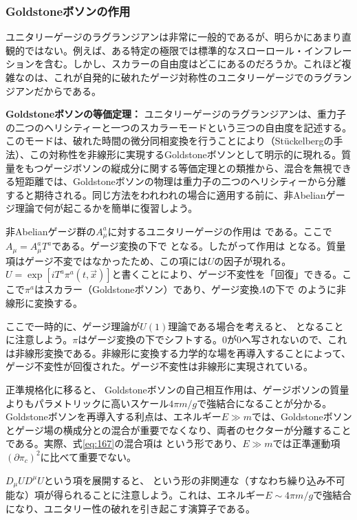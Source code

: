 \subsubsection{Goldstoneボソンの作用}

ユニタリーゲージのラグランジアンは非常に一般的であるが、明らかにあまり直観的ではない。例えば、ある特定の極限では標準的なスローロール・インフレーションを含む。しかし、スカラーの自由度はどこにあるのだろうか。これほど複雑なのは、これが自発的に破れたゲージ対称性のユニタリーゲージでのラグランジアンだからである。

\noindent\textbf{Goldstoneボソンの等価定理：}
ユニタリーゲージのラグランジアンは、重力子の二つのヘリシティーと一つのスカラーモードという三つの自由度を記述する。このモードは、破れた時間の微分同相変換を行うことにより（Stückelbergの手法）、この対称性を非線形に実現するGoldstoneボソンとして明示的に現れる。質量をもつゲージボソンの縦成分に関する等価定理\cite{Cornwall:1974km}との類推から、混合を無視できる短距離では、Goldstoneボソンの物理は重力子の二つのヘリシティーから分離すると期待される。同じ方法をわれわれの場合に適用する前に、非Abelianゲージ理論で何が起こるかを簡単に復習しよう。

非Abelianゲージ群の$A_\mu^a$に対するユニタリーゲージの作用は
である。ここで$A_\mu=A_\mu^aT^a$である。ゲージ変換の下で
となる。したがって作用は
となる。質量項はゲージ不変ではなかったため、この項には$U$の因子が現れる。$U=\exp[iT^a\pi^a(t,\vec{x})]$と書くことにより、ゲージ不変性を「回復」できる。ここで$\pi^a$はスカラー（Goldstoneボソン）であり、ゲージ変換$\Lambda$の下で
のように非線形に変換する。

ここで一時的に、ゲージ理論が$U(1)$理論である場合を考えると、
となることに注意しよう。$\pi$はゲージ変換の下でシフトする。$0$が$0$へ写されないので、これは非線形変換である。非線形に変換する力学的な場を再導入することによって、ゲージ不変性が回復された。ゲージ不変性は非線形に実現されている。

正準規格化に移ると、
Goldstoneボソンの自己相互作用は、ゲージボソンの質量よりもパラメトリックに高いスケール$4\pi m/g$で強結合になることが分かる。Goldstoneボソンを再導入する利点は、エネルギー$E\gg m$では、Goldstoneボソンとゲージ場の横成分との混合が重要でなくなり、両者のセクターが分離することである。実際、式\eqref{eq:167}の混合項は
という形であり、$E\gg m$では正準運動項$(\partial\pi_c)^2$に比べて重要でない。

$D_\mu U D^\mu U$という項を展開すると、
という形の非関連な（すなわち繰り込み不可能な）項が得られることに注意しよう。これは、エネルギー$E\sim4\pi m/g$で強結合になり、ユニタリー性の破れを引き起こす演算子である。

